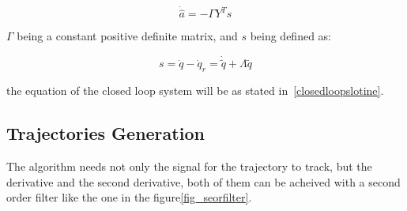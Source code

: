 \documentclass[journal]{IEEEtran}
\begin{document}
        \begin{equation}
            \dot{\hat{a}} = - \Gamma Y^T s
        \end{equation}

        $\Gamma$ being a constant positive definite matrix, and $s$ being defined as:

        \begin{equation}
            s = \dot{q} - \dot{q}_r = \dot{\tilde{q}} + \Lambda \tilde{q}
        \end{equation}

        the equation of the closed loop system will be as stated in~\ref{closedloopslotine}.

    \subsection{Trajectories Generation}
        The algorithm needs not only the signal for the trajectory to track, but the derivative and the second derivative, both of them can be acheived with a second order filter like the one in the figure\ref{fig_seorfilter}.
\end{document}

